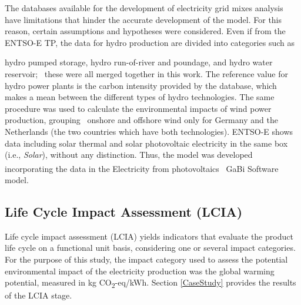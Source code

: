 The databases available for the development of electricity grid mixes analysis have limitations that hinder the accurate development of the model. For this reason, certain assumptions and hypotheses were considered. Even if from the ENTSO-E TP, the data for hydro production are divided into categories such as {hydro pumped storage, hydro run-of-river and poundage, and hydro water reservoir;%
~these were all merged together in this work. {The reference value for hydro power plants is the carbon intensity provided by the database, which makes a mean between the different types of hydro technologies}. The same procedure was used to calculate the environmental impacts of wind power production, {grouping}%
~onshore and offshore wind only for Germany and the Netherlands (the two countries which have both technologies). ENTSO-E shows data including solar thermal and solar photovoltaic electricity in the same box (i.e., \textit{Solar}), without any distinction. Thus, the model was developed incorporating the data in the Electricity from photovoltaics%
~GaBi\textsuperscript{\textregistered} Software model.



{\subsection{Life Cycle Impact Assessment (LCIA)}}
{Life cycle impact assessment (LCIA) yields indicators  that evaluate the product life cycle on a functional unit basis, considering one or several impact categories. For the purpose of this study, the impact category used to assess the potential environmental impact of the electricity production was the global warming potential, measured in kg CO\textsubscript2-eq/kWh}. Section \ref{CaseStudy} provides the results of the LCIA stage.}

